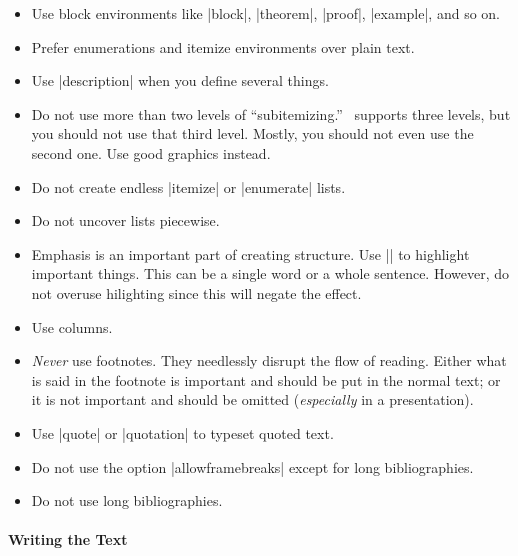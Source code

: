 \begin{itemize}
\item
  Use block environments like |block|, |theorem|, |proof|, |example|,
  and so on.
\item
  Prefer enumerations and itemize environments over plain text.
\item
  Use |description| when you define several things.
\item
  Do not use more than two levels of ``subitemizing.'' \beamer\
  supports three levels, but you should not use that third
  level. Mostly, you should not even use the second one. Use good
  graphics instead.
\item
  Do not create endless |itemize| or |enumerate| lists.
\item
  Do not uncover lists piecewise. 
\item
  Emphasis is an important part of creating structure. Use |\alert| to
  highlight important things. This can be a single word or a whole
  sentence. However, do not overuse hilighting since this will negate
  the effect.
\item
  Use columns.
\item
  \emph{Never} use footnotes. They needlessly disrupt the flow of
  reading. Either what is said in the footnote is important and should
  be put in the normal text; or it is not important and should be
  omitted (\emph{especially} in a presentation).
\item
  Use |quote| or |quotation| to typeset quoted text.
\item
  Do not use the option |allowframebreaks| except for long
  bibliographies.
\item
  Do not use long bibliographies.
\end{itemize}




\paragraph{Writing the Text}

